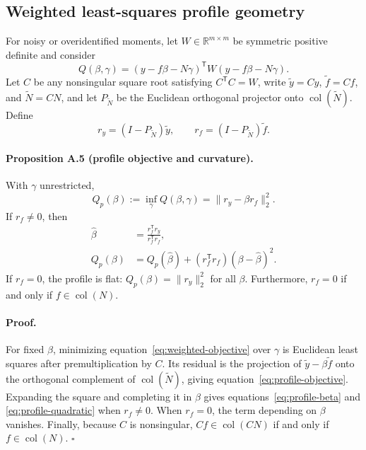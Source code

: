 \subsection{Weighted least-squares profile geometry}
\label{app:weighted-profile}

For noisy or overidentified moments, let \(W\in\mathbb R^{m\times m}\) be
symmetric positive definite and consider
\begin{equation}
  Q(\beta,\gamma)
  =(y-f\beta-N\gamma)^{\mathsf T}
    W(y-f\beta-N\gamma).
  \label{eq:weighted-objective}
\end{equation}
Let \(C\) be any nonsingular square root satisfying \(C^{\mathsf T}C=W\),
write \(\widetilde y=Cy\), \(\widetilde f=Cf\), and
\(\widetilde N=CN\), and let \(P_{\widetilde N}\) be the Euclidean
orthogonal projector onto \(\operatorname{col}(\widetilde N)\). Define
\begin{equation}
  r_y=(I-P_{\widetilde N})\widetilde y,
  \qquad
  r_f=(I-P_{\widetilde N})\widetilde f.
  \label{eq:weighted-residuals}
\end{equation}

\paragraph{Proposition A.5 (profile objective and curvature).}
With \(\gamma\) unrestricted,
\begin{equation}
  Q_p(\beta)
  :=\inf_{\gamma}Q(\beta,\gamma)
  =\lVert r_y-\beta r_f\rVert_2^2.
  \label{eq:profile-objective}
\end{equation}
If \(r_f\neq0\), then
\begin{align}
  \widehat\beta
    &=\frac{r_f^{\mathsf T}r_y}{r_f^{\mathsf T}r_f},
    \label{eq:profile-beta}\\
  Q_p(\beta)
    &=Q_p(\widehat\beta)
      +(r_f^{\mathsf T}r_f)(\beta-\widehat\beta)^2.
    \label{eq:profile-quadratic}
\end{align}
If \(r_f=0\), the profile is flat:
\(Q_p(\beta)=\lVert r_y\rVert_2^2\) for all \(\beta\). Furthermore,
\(r_f=0\) if and only if \(f\in\operatorname{col}(N)\).

\paragraph{Proof.}
For fixed \(\beta\), minimizing equation~\eqref{eq:weighted-objective} over
\(\gamma\) is Euclidean least squares after premultiplication by \(C\). Its
residual is the projection of \(\widetilde y-\beta\widetilde f\) onto the
orthogonal complement of \(\operatorname{col}(\widetilde N)\), giving
equation~\eqref{eq:profile-objective}. Expanding the square and completing it
in \(\beta\) gives equations~\eqref{eq:profile-beta} and
\eqref{eq:profile-quadratic} when \(r_f\neq0\). When \(r_f=0\), the term
depending on \(\beta\) vanishes. Finally, because \(C\) is nonsingular,
\(Cf\in\operatorname{col}(CN)\) if and only if
\(f\in\operatorname{col}(N)\).
\(\square\)

